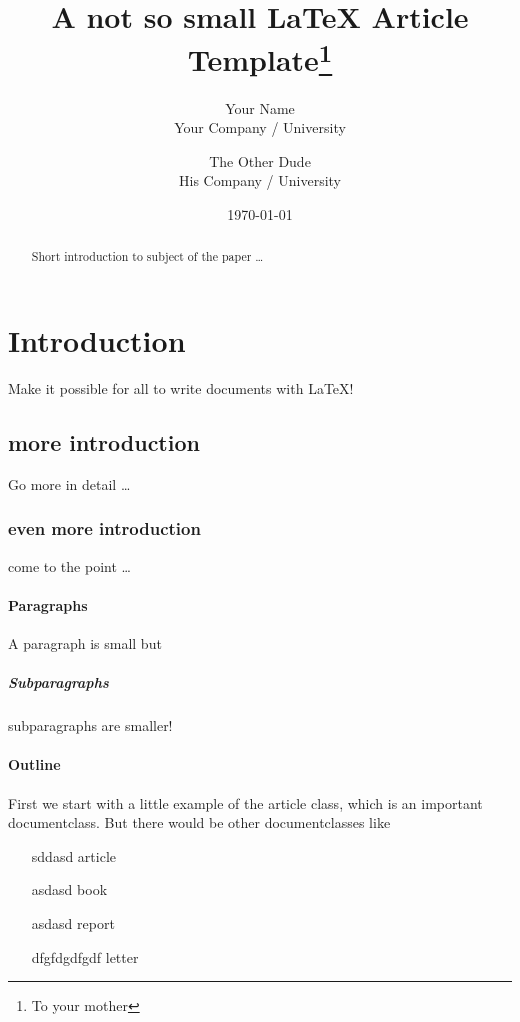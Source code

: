 \documentclass[12pt, a4paper, twoside, titlepage]{article}
\title{A not so small \LaTeX{} Article Template\thanks{To your mother}}
\author{
 	Your Name  \\
 	Your Company / University  \\
 	\and 
 	The Other Dude \\
 	His Company / University \\
 }
\date{\today}
\begin{document}
\maketitle

 \begin{abstract}
 Short introduction to subject of the paper \ldots 
 \end{abstract}

\tableofcontents %

\newpage

\section{Introduction}
Make it possible for all to write documents with \LaTeX{}!

\subsection{more introduction}
Go more in detail \ldots

\subsubsection{even more introduction}
come to the point \ldots

\paragraph{Paragraphs}
A paragraph is small but 

\subparagraph{Subparagraphs}
subparagraphs are smaller! 

\paragraph{Outline}
First we start with a little example of the article class, which is an 
important documentclass. But there would be other documentclasses like 

 \begin{enumerate}
 	\item[sddasd] article
 	\item[asdasd] book 
 	\item[asdasd] report 
 	\item[dfgfdgdfgdf] letter 
 \end{enumerate}
\end{document}

